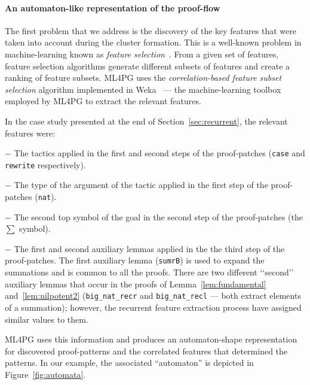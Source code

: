 \paragraph{An automaton-like representation of the proof-flow}
The first problem that we address is the discovery of the key features that were taken
into account during the cluster formation. This is a well-known problem in machine-learning 
known as \emph{feature selection}~\cite{Bishop}. From a given set of features, feature selection algorithms 
generate different subsets of features and create a ranking of feature subsets.
ML4PG uses the \emph{correlation-based feature subset selection} algorithm implemented in Weka~\cite{Weka}
--- the machine-learning toolbox employed by ML4PG to extract the relevant features.

\begin{example}\label{ex:correlation-features}
In the case study presented at the end of Section~\ref{sec:recurrent}, the relevant features were:

$-$ The tactics applied in the first and second steps of the proof-patches (\lstinline?case? and \lstinline?rewrite? respectively).

$-$ The type of the argument of the tactic applied in the first step of the proof-patches (\lstinline?nat?).

$-$ The second top symbol of the goal in the second step of the proof-patches (the $\sum$ symbol). 

$-$ The first and second auxiliary lemmas applied in the the third step of the proof-patches. The first auxiliary lemma (\lstinline?sumrB?) is used to expand the summations and is 
common to all the proofs. There are two different \lq\lq{}second\rq\rq{} auxiliary lemmas that occur in the proofs of Lemma~\ref{lem:fundamental} and~\ref{lem:nilpotent2} (\lstinline?big_nat_recr? and
\lstinline?big_nat_recl? --- both extract elements of a summation); however, the recurrent feature extraction process have assigned similar values to them.

ML4PG uses this information and produces an automaton-shape representation for discovered %
proof-patterns and the correlated features that determined the patterns. In our example, the associated ``automaton'' is depicted in Figure~\ref{fig:automata}. 
\end{example}





